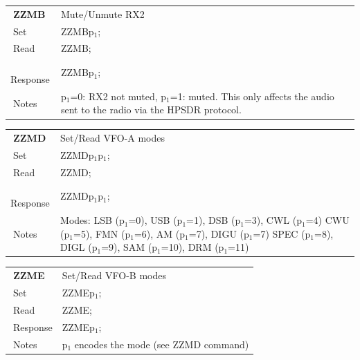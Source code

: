 \documentclass[12pt]{book}
\begin{document}
\begin{center}
\begin{tabular}{|p{2cm}|p{11cm}|}
\toprule
$\phantom{\Big|}$\textbf{\large ZZMB} & Mute/Unmute RX2 \\\cline{1-2}
$\phantom{\Big|}${\large Set} & {ZZMBp$_1$;} \\\hline
$\phantom{\Big|}${\large Read} & {ZZMB;} \\\hline
$\phantom{\Big|}${\large Response} & {ZZMBp$_1$;} \\\hline
$\phantom{\Big|}${\large Notes} & \multicolumn{1}{|p{11cm}|}{p$_1$=0: RX2 not muted, p$_1$=1: muted. This only affects the audio sent to the radio via the HPSDR protocol.} \\
\bottomrule
\end{tabular}
\end{center}

\begin{center}
\begin{tabular}{|p{2cm}|p{11cm}|}
\toprule
$\phantom{\Big|}$\textbf{\large ZZMD} & Set/Read VFO-A modes \\\cline{1-2}
$\phantom{\Big|}${\large Set} & {ZZMDp$_1$p$_1$;} \\\hline
$\phantom{\Big|}${\large Read} & {ZZMD;} \\\hline
$\phantom{\Big|}${\large Response} & {ZZMDp$_1$p$_1$;} \\\hline
$\phantom{\Big|}${\large Notes} & \multicolumn{1}{|p{11cm}|}{Modes: LSB (p$_1$=0), USB (p$_1$=1), DSB (p$_1$=3), CWL (p$_1$=4) CWU (p$_1$=5), FMN (p$_1$=6), AM (p$_1$=7), DIGU (p$_1$=7) SPEC (p$_1$=8), DIGL (p$_1$=9), SAM (p$_1$=10), DRM (p$_1$=11)} \\
\bottomrule
\end{tabular}
\end{center}

\begin{center}
\begin{tabular}{|p{2cm}|p{11cm}|}
\toprule
$\phantom{\Big|}$\textbf{\large ZZME} & Set/Read VFO-B modes \\\cline{1-2}
$\phantom{\Big|}${\large Set} & {ZZMEp$_1$;} \\\hline
$\phantom{\Big|}${\large Read} & {ZZME;} \\\hline
$\phantom{\Big|}${\large Response} & {ZZMEp$_1$;} \\\hline
$\phantom{\Big|}${\large Notes} & \multicolumn{1}{|p{11cm}|}{p$_1$ encodes the mode (see ZZMD command)} \\
\bottomrule
\end{tabular}
\end{center}
\end{document}
